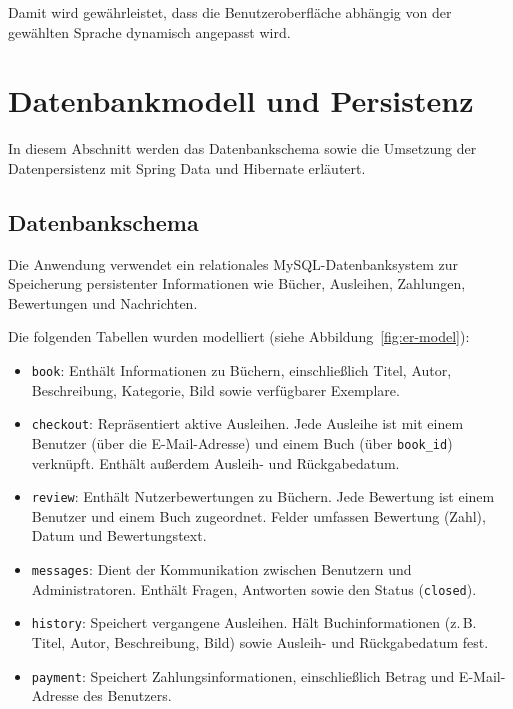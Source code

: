 \noindent Damit wird gewährleistet, dass die Benutzeroberfläche abhängig von der gewählten Sprache dynamisch angepasst wird.


\section{Datenbankmodell und Persistenz}
In diesem Abschnitt werden das Datenbankschema sowie die Umsetzung der Datenpersistenz mit Spring Data und Hibernate erläutert.

\subsection{Datenbankschema}

Die Anwendung verwendet ein relationales MySQL-Datenbanksystem zur Speicherung persistenter Informationen wie Bücher, Ausleihen, Zahlungen, Bewertungen und Nachrichten.

\noindent Die folgenden Tabellen wurden modelliert (siehe Abbildung~\ref{fig:er-model}):

\begin{itemize}
		\item \texttt{book}: Enthält Informationen zu Büchern, einschließlich Titel, Autor, Beschreibung, Kategorie, Bild sowie verfügbarer Exemplare.
	
	\item \texttt{checkout}: Repräsentiert aktive Ausleihen. Jede Ausleihe ist mit einem Benutzer (über die E-Mail-Adresse) und einem Buch (über \texttt{book\_id}) verknüpft. Enthält außerdem Ausleih- und Rückgabedatum.
	
	\item \texttt{review}: Enthält Nutzerbewertungen zu Büchern. Jede Bewertung ist einem Benutzer und einem Buch zugeordnet. Felder umfassen Bewertung (Zahl), Datum und Bewertungstext.
	
	\item \texttt{messages}: Dient der Kommunikation zwischen Benutzern und Administratoren. Enthält Fragen, Antworten sowie den Status (\texttt{closed}).
	
	\item \texttt{history}: Speichert vergangene Ausleihen. Hält Buchinformationen (z.\,B. Titel, Autor, Beschreibung, Bild) sowie Ausleih- und Rückgabedatum fest.
	
	\item \texttt{payment}: Speichert Zahlungsinformationen, einschließlich Betrag und E-Mail-Adresse des Benutzers.
\end{itemize}

